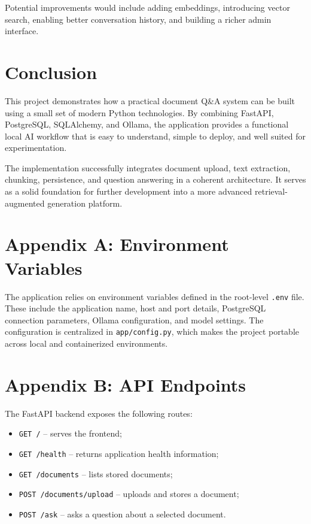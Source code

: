 ﻿\documentclass[11pt,a4paper]{article}
\begin{document}
Potential improvements would include adding embeddings, introducing vector search, enabling better conversation history, and building a richer admin interface.

\section{Conclusion}
This project demonstrates how a practical document Q\&A system can be built using a small set of modern Python technologies. By combining FastAPI, PostgreSQL, SQLAlchemy, and Ollama, the application provides a functional local AI workflow that is easy to understand, simple to deploy, and well suited for experimentation.

The implementation successfully integrates document upload, text extraction, chunking, persistence, and question answering in a coherent architecture. It serves as a solid foundation for further development into a more advanced retrieval-augmented generation platform.

\appendix
\section{Appendix A: Environment Variables}
The application relies on environment variables defined in the root-level \texttt{.env} file. These include the application name, host and port details, PostgreSQL connection parameters, Ollama configuration, and model settings. The configuration is centralized in \texttt{app/config.py}, which makes the project portable across local and containerized environments.

\section{Appendix B: API Endpoints}
The FastAPI backend exposes the following routes:
\begin{itemize}[leftmargin=*]
    \item \texttt{GET /} -- serves the frontend; 
    \item \texttt{GET /health} -- returns application health information; 
    \item \texttt{GET /documents} -- lists stored documents; 
    \item \texttt{POST /documents/upload} -- uploads and stores a document; 
    \item \texttt{POST /ask} -- asks a question about a selected document.
\end{itemize}
\end{document}
